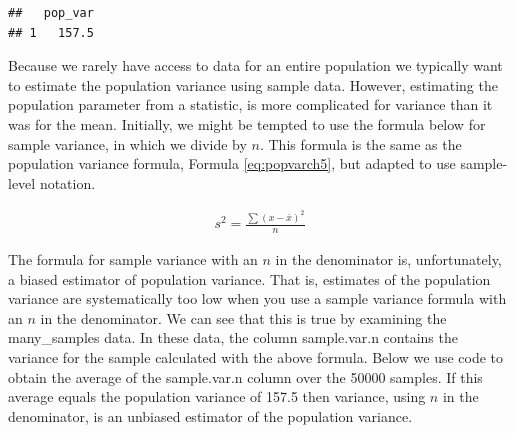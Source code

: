 \documentclass[
]{krantz}
\makeatletter
\newenvironment{Shaded}{\begin{snugshade}}{\end{snugshade}}
\newcommand{\DataTypeTok}[1]{\textcolor[rgb]{0.27,0.27,0.27}{#1}}
\newcommand{\KeywordTok}[1]{\textcolor[rgb]{0.27,0.27,0.27}{\textbf{#1}}}
\newcommand{\NormalTok}[1]{#1}
\newcommand{\OperatorTok}[1]{\textcolor[rgb]{0.43,0.43,0.43}{\textbf{#1}}}
\newcommand{\StringTok}[1]{\textcolor[rgb]{0.5,0.5,0.5}{#1}}
\newenvironment{kframe}{%
\medskip{}
\setlength{\fboxsep}{.8em}
 \def\at@end@of@kframe{}%
 \ifinner\ifhmode%
  \def\at@end@of@kframe{\end{minipage}}%
  \begin{minipage}{\columnwidth}%
 \fi\fi%
 \def\FrameCommand##1{\hskip\@totalleftmargin \hskip-\fboxsep
 \colorbox{shadecolor}{##1}\hskip-\fboxsep
     \hskip-\linewidth \hskip-\@totalleftmargin \hskip\columnwidth}%
 \MakeFramed {\advance\hsize-\width
   \@totalleftmargin\z@ \linewidth\hsize
   \@setminipage}}%
 {\par\unskip\endMakeFramed%
 \at@end@of@kframe}
\renewenvironment{Shaded}{\begin{kframe}}{\end{kframe}}
\makeatother
\begin{document}
\begin{Shaded}
\end{Shaded}

\begin{verbatim}
##   pop_var
## 1   157.5
\end{verbatim}

Because we rarely have access to data for an entire population we typically want to estimate the population variance using sample data. However, estimating the population parameter from a statistic, is more complicated for variance than it was for the mean. Initially, we might be tempted to use the formula below for sample variance, in which we divide by \(n\). This formula is the same as the population variance formula, Formula \eqref{eq:popvarch5}, but adapted to use sample-level notation.

\[
\begin{aligned} 
s^2 = \frac{\sum{(x - \bar{x})^2}}{n}
\end{aligned} 
\]

The formula for sample variance with an \(n\) in the denominator is, unfortunately, a biased estimator of population variance. That is, estimates of the population variance are systematically too low when you use a sample variance formula with an \(n\) in the denominator. We can see that this is true by examining the many\_samples data. In these data, the column sample.var.n contains the variance for the sample calculated with the above formula. Below we use code to obtain the average of the sample.var.n column over the 50000 samples. If this average equals the population variance of 157.5 then variance, using \(n\) in the denominator, is an unbiased estimator of the population variance.

\begin{Shaded}
\end{Shaded}
\end{document}
